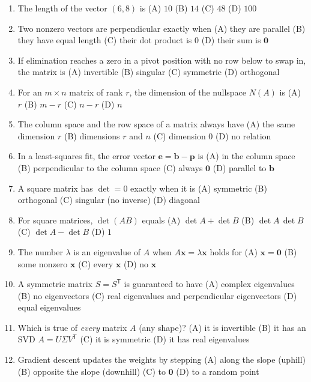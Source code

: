 \documentclass[10pt]{article}
\newcommand{\xx}{\mathbf{x}}
\newcommand{\bb}{\mathbf{b}}
\newcommand{\pp}{\mathbf{p}}
\newcommand{\ee}{\mathbf{e}}
\newcommand{\zero}{\mathbf{0}}
\newcommand{\T}{\mathsf{T}}
\begin{document}
\begin{enumerate}[leftmargin=1.9em, itemsep=8pt]
  \item The length of the vector $(6,8)$ is
    \hfill (A) $10$ \quad (B) $14$ \quad (C) $48$ \quad (D) $100$
  \item Two nonzero vectors are perpendicular exactly when
    \hfill (A) they are parallel \quad (B) they have equal length \quad (C) their dot product is $0$ \quad (D) their sum is $\zero$
  \item If elimination reaches a zero in a pivot position with no row below to swap in, the matrix is
    \hfill (A) invertible \quad (B) singular \quad (C) symmetric \quad (D) orthogonal
  \item For an $m\times n$ matrix of rank $r$, the dimension of the nullspace $N(A)$ is
    \hfill (A) $r$ \quad (B) $m-r$ \quad (C) $n-r$ \quad (D) $n$
  \item The column space and the row space of a matrix always have
    \hfill (A) the same dimension $r$ \quad (B) dimensions $r$ and $n$ \quad (C) dimension $0$ \quad (D) no relation
  \item In a least-squares fit, the error vector $\ee=\bb-\pp$ is
    \hfill (A) in the column space \quad (B) perpendicular to the column space \quad (C) always $\zero$ \quad (D) parallel to $\bb$
  \item A square matrix has $\det=0$ exactly when it is
    \hfill (A) symmetric \quad (B) orthogonal \quad (C) singular (no inverse) \quad (D) diagonal
  \item For square matrices, $\det(AB)$ equals
    \hfill (A) $\det A+\det B$ \quad (B) $\det A\,\det B$ \quad (C) $\det A-\det B$ \quad (D) $1$
  \item The number $\lambda$ is an eigenvalue of $A$ when $A\xx=\lambda\xx$ holds for
    \hfill (A) $\xx=\zero$ \quad (B) some nonzero $\xx$ \quad (C) every $\xx$ \quad (D) no $\xx$
  \item A symmetric matrix $S=S^\T$ is guaranteed to have
    \hfill (A) complex eigenvalues \quad (B) no eigenvectors \quad (C) real eigenvalues and perpendicular eigenvectors \quad (D) equal eigenvalues
  \item Which is true of \emph{every} matrix $A$ (any shape)?
    \hfill (A) it is invertible \quad (B) it has an SVD $A=U\Sigma V^\T$ \quad (C) it is symmetric \quad (D) it has real eigenvalues
  \item Gradient descent updates the weights by stepping
    \hfill (A) along the slope (uphill) \quad (B) opposite the slope (downhill) \quad (C) to $\zero$ \quad (D) to a random point
\end{enumerate}
\end{document}
